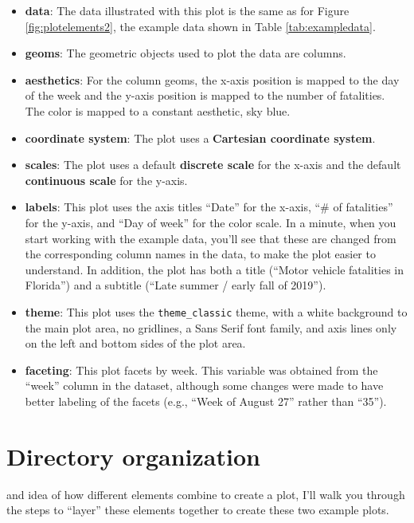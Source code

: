 \documentclass[]{tufte-book}
\providecommand{\tightlist}{%
  \setlength{\itemsep}{0pt}\setlength{\parskip}{0pt}}
\begin{document}
\begin{itemize}
\tightlist
\item
  \textbf{data}: The data illustrated with this plot is the same as for Figure
  \ref{fig:plotelements2}, the example data
  shown in Table \ref{tab:exampledata}.
\item
  \textbf{geoms}: The geometric objects used to plot the data are columns.
\item
  \textbf{aesthetics}: For the column geoms, the x-axis position is mapped to the day
  of the week and the y-axis position is mapped to the number of fatalities. The
  color is mapped to a constant aesthetic, sky blue.
\item
  \textbf{coordinate system}: The plot uses a \textbf{Cartesian coordinate system}.
\item
  \textbf{scales}: The plot uses a default \textbf{discrete scale} for the x-axis and the
  default \textbf{continuous scale} for the y-axis.
\item
  \textbf{labels}: This plot uses the axis titles ``Date'' for the x-axis, ``\# of fatalities''
  for the y-axis, and ``Day of week'' for the color scale. In a minute, when you start
  working with the example data, you'll see that these are changed from the corresponding
  column names in the data, to make the plot easier to understand. In addition,
  the plot has both a title (``Motor vehicle fatalities in Florida'') and a
  subtitle (``Late summer / early fall of 2019'').
\item
  \textbf{theme}: This plot uses the \texttt{theme\_classic} theme, with a white background
  to the main plot area, no gridlines, a Sans Serif font family,
  and axis lines only on the left and bottom sides of the plot area.
\item
  \textbf{faceting}: This plot facets by week. This variable was obtained from the ``week''
  column in the dataset, although some changes were made to have better labeling of
  the facets (e.g., ``Week of August 27'' rather than ``35'').
\end{itemize}

\hypertarget{directory-organization}{%
\section{Directory organization}\label{directory-organization}}

 and idea of how different elements combine to
create a plot, I'll walk you through the steps to ``layer'' these elements together
to create these two example plots.
\end{document}
